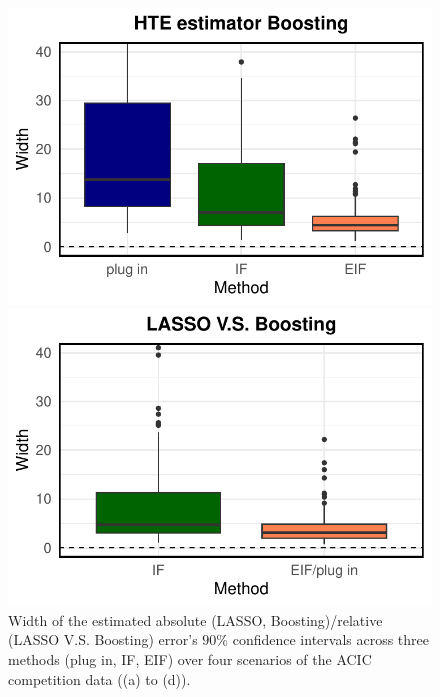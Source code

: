 \begin{figure}[ht]
\begin{minipage}{0.3\textwidth}
                \includegraphics[clip, trim = 0cm 0cm 0cm 0cm, width = \textwidth]{plot/ACIC_nonlinear_propensity_nonlinear_HTE_CI_width_Boosting.pdf}
        \end{minipage}
        \begin{minipage}{0.3\textwidth}
                \centering
                \includegraphics[clip, trim = 0cm 0cm 0cm 0cm, width = \textwidth]{plot/ACIC_nonlinear_propensity_nonlinear_HTE_CI_width_LASSO_V.S._Boosting.pdf}
        \end{minipage}        
        \caption{
        Width of the estimated absolute (LASSO, Boosting)/relative (LASSO V.S. Boosting) error's $90\%$ confidence intervals across three methods (plug in, IF, EIF) over four scenarios of the ACIC competition data ((a) to (d)). 
        }
    \label{fig:ACIC.width}
\end{figure}


